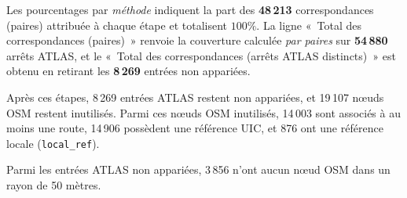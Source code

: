 Les pourcentages par \emph{méthode} indiquent la part des \textbf{48\,213} correspondances (paires) attribuée à chaque étape et totalisent \(100\%\). La ligne «\ Total des correspondances (paires)\ » renvoie la couverture calculée \emph{par paires} sur \textbf{54\,880} arrêts ATLAS, et le «\ Total des correspondances (arrêts ATLAS distincts)\ » est obtenu en retirant les \textbf{8\,269} entrées non appariées.

Après ces étapes, 8\,269 entrées ATLAS restent non appariées, et 19\,107 nœuds OSM restent inutilisés. Parmi ces nœuds OSM inutilisés, 14\,003 sont associés à au moins une route, 14\,906 possèdent une référence UIC, et 876 ont une référence locale (\texttt{local\_ref}).

Parmi les entrées ATLAS non appariées, 3\,856 n'ont aucun nœud OSM dans un rayon de 50 mètres.


